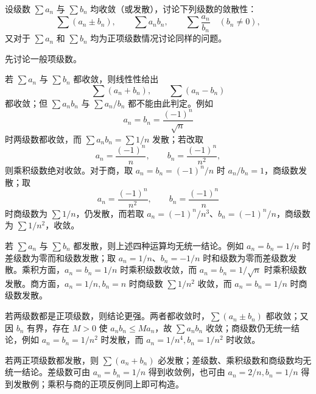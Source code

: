 \begin{xthought}[2]
设级数 $\sum a_n$ 与 $\sum b_n$ 均收敛（或发散），讨论下列级数的敛散性：
\[
\sum(a_n\pm b_n),\qquad \sum a_nb_n,\qquad \sum\frac{a_n}{b_n}\quad(b_n\neq0),
\]
又对于 $\sum a_n$ 和 $\sum b_n$ 均为正项级数情况讨论同样的问题。
\end{xthought}
\begin{xsolution}
先讨论一般项级数。

若 $\sum a_n$ 与 $\sum b_n$ 都收敛，则线性性给出
\[
 \sum(a_n+b_n),\qquad \sum(a_n-b_n)
\]
都收敛；但 $\sum a_nb_n$ 与 $\sum a_n/b_n$ 都不能由此判定。例如
\[
 a_n=b_n=\frac{(-1)^n}{\sqrt n}
\]
时两级数都收敛，而 $\sum a_nb_n=\sum 1/n$ 发散；若改取
\[
 a_n=\frac{(-1)^n}{n},\qquad b_n=\frac{(-1)^n}{n^2},
\]
则乘积级数绝对收敛。对于商，取 $a_n=b_n=(-1)^n/n$ 时 $a_n/b_n=1$，商级数发散；取
\[
 a_n=\frac{(-1)^n}{n^2},\qquad b_n=\frac{(-1)^n}{n}
\]
时商级数为 $\sum1/n$，仍发散，而若取 $a_n=(-1)^n/n^3$、$b_n=(-1)^n/n$，商级数为 $\sum1/n^2$，收敛。

若 $\sum a_n$ 与 $\sum b_n$ 都发散，则上述四种运算均无统一结论。例如 $a_n=b_n=1/n$ 时差级数为零而和级数发散；取 $a_n=1/n$、$b_n=-1/n$ 时和级数为零而差级数发散。乘积方面，$a_n=b_n=1/n$ 时乘积级数收敛，而 $a_n=b_n=1/\sqrt n$ 时乘积级数发散。商方面，$a_n=1/n,b_n=n$ 时商级数 $\sum1/n^2$ 收敛，而 $a_n=b_n=1/n$ 时商级数发散。

若两级数都是正项级数，则结论更强。两者都收敛时，$\sum(a_n\pm b_n)$ 都收敛；又因 $b_n$ 有界，存在 $M>0$ 使 $a_nb_n\leq Ma_n$，故 $\sum a_nb_n$ 收敛；商级数仍无统一结论，例如 $a_n=b_n=1/n^2$ 时发散，而 $a_n=1/n^4,b_n=1/n^2$ 时收敛。

若两正项级数都发散，则 $\sum(a_n+b_n)$ 必发散；差级数、乘积级数和商级数均无统一结论。差级数可由 $a_n=b_n=1/n$ 得到收敛例，也可由 $a_n=2/n,b_n=1/n$ 得到发散例；乘积与商的正项反例同上即可构造。
\end{xsolution}


